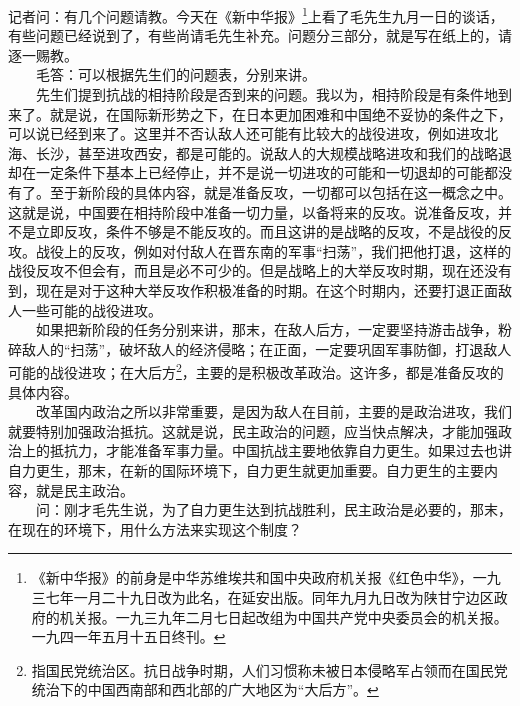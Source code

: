 \documentclass[cn,11pt,chinese]{elegantbook}
\begin{document}
记者问：有几个问题请教。今天在《新中华报》\footnote[2]{ 《新中华报》的前身是中华苏维埃共和国中央政府机关报《红色中华》，一九三七年一月二十九日改为此名，在延安出版。同年九月九日改为陕甘宁边区政府的机关报。一九三九年二月七日起改组为中国共产党中央委员会的机关报。一九四一年五月十五日终刊。}上看了毛先生九月一日的谈话，有些问题已经说到了，有些尚请毛先生补充。问题分三部分，就是写在纸上的，请逐一赐教。\\
　　毛答：可以根据先生们的问题表，分别来讲。\\
　　先生们提到抗战的相持阶段是否到来的问题。我以为，相持阶段是有条件地到来了。就是说，在国际新形势之下，在日本更加困难和中国绝不妥协的条件之下，可以说已经到来了。这里并不否认敌人还可能有比较大的战役进攻，例如进攻北海、长沙，甚至进攻西安，都是可能的。说敌人的大规模战略进攻和我们的战略退却在一定条件下基本上已经停止，并不是说一切进攻的可能和一切退却的可能都没有了。至于新阶段的具体内容，就是准备反攻，一切都可以包括在这一概念之中。这就是说，中国要在相持阶段中准备一切力量，以备将来的反攻。说准备反攻，并不是立即反攻，条件不够是不能反攻的。而且这讲的是战略的反攻，不是战役的反攻。战役上的反攻，例如对付敌人在晋东南的军事“扫荡”，我们把他打退，这样的战役反攻不但会有，而且是必不可少的。但是战略上的大举反攻时期，现在还没有到，现在是对于这种大举反攻作积极准备的时期。在这个时期内，还要打退正面敌人一些可能的战役进攻。\\
　　如果把新阶段的任务分别来讲，那末，在敌人后方，一定要坚持游击战争，粉碎敌人的“扫荡”，破坏敌人的经济侵略；在正面，一定要巩固军事防御，打退敌人可能的战役进攻；在大后方\footnote[3]{ 指国民党统治区。抗日战争时期，人们习惯称未被日本侵略军占领而在国民党统治下的中国西南部和西北部的广大地区为“大后方”。}，主要的是积极改革政治。这许多，都是准备反攻的具体内容。\\
　　改革国内政治之所以非常重要，是因为敌人在目前，主要的是政治进攻，我们就要特别加强政治抵抗。这就是说，民主政治的问题，应当快点解决，才能加强政治上的抵抗力，才能准备军事力量。中国抗战主要地依靠自力更生。如果过去也讲自力更生，那末，在新的国际环境下，自力更生就更加重要。自力更生的主要内容，就是民主政治。\\
　　问：刚才毛先生说，为了自力更生达到抗战胜利，民主政治是必要的，那末，在现在的环境下，用什么方法来实现这个制度？\\
\end{document}

